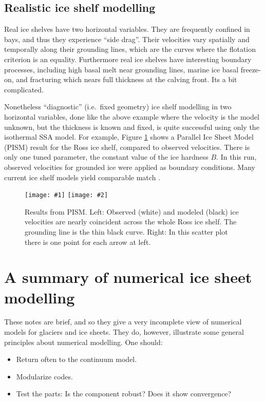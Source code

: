 \documentclass[letterpaper,final,12pt,reqno]{amsart}
\newcommand{\twofigsizes}[5]{
\begin{figure}[ht]
\centering
\texttt{[image: \#1]} \quad
\texttt{[image: \#2]}
\caption{#3}
\label{fig:#1}
\end{figure}}
\begin{document}
\subsection*{Realistic ice shelf modelling}  Real ice shelves have two horizontal variables.  They are frequently confined in bays, and thus they experience ``side drag''.  Their velocities vary spatially and temporally along their grounding lines, which are the curves where the flotation criterion is an equality.  Furthermore real ice shelves have interesting boundary processes, including high basal melt near grounding lines, marine ice basal freeze-on, and fracturing which nears full thickness at the calving front.  Its a bit complicated.

Nonetheless ``diagnostic'' (i.e.~fixed geometry) ice shelf modelling in two horizontal variables, done like the above example where the velocity is the model unknown, but the thickness is known and fixed, is quite successful using only the isothermal SSA model.  For example, Figure \ref{fig:rossquiver} shows a Parallel Ice Sheet Model (PISM) result for the Ross ice shelf, compared to observed velocities.  There is only one tuned parameter, the constant value of the ice hardness $B$.  In this run, observed velocities for grounded ice were applied as boundary conditions.  Many current ice shelf models yield comparable match \cite{MacAyealetal}.

\twofigsizes{rossquiver}{rossscatter}{Results from PISM.  Left: Observed (white) and modeled (black) ice velocities are nearly coincident across the whole Ross ice shelf.  The grounding line is the thin black curve.  Right: In this scatter plot there is one point for each arrow at left.}{3.0in}{3.0in}


\section{A summary of numerical ice sheet modelling}

These notes are brief, and so they give a very incomplete view of numerical models for glaciers and ice sheets.  They do, however, illustrate some general principles about numerical modelling.  One should:
\begin{itemize}
\item Return often to the continuum model.
\item Modularize codes.
\item Test the parts: Is the component robust? Does it show convergence?
\end{itemize}
\end{document}
